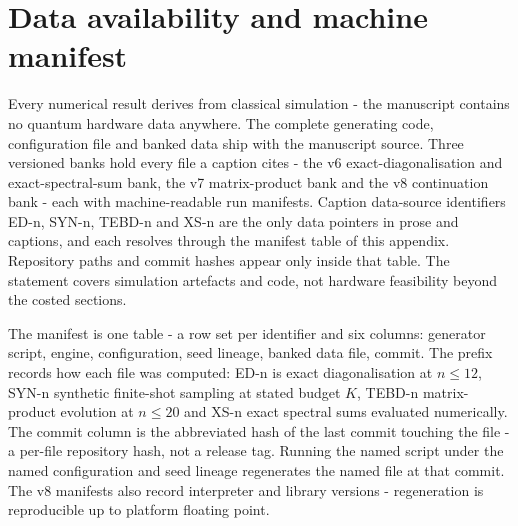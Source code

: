 \section{Data availability and machine manifest}\label{app:NA2}

Every numerical result derives from classical simulation - the manuscript contains no quantum hardware data anywhere. The complete generating code, configuration file and banked data ship with the manuscript source. Three versioned banks hold every file a caption cites - the v6 exact-diagonalisation and exact-spectral-sum bank, the v7 matrix-product bank and the v8 continuation bank - each with machine-readable run manifests. Caption data-source identifiers ED-n, SYN-n, TEBD-n and XS-n are the only data pointers in prose and captions, and each resolves through the manifest table of this appendix. Repository paths and commit hashes appear only inside that table. The statement covers simulation artefacts and code, not hardware feasibility beyond the costed sections.

The manifest is one table - a row set per identifier and six columns: generator script, engine, configuration, seed lineage, banked data file, commit. The prefix records how each file was computed: ED-n is exact diagonalisation at $n \le 12$, SYN-n synthetic finite-shot sampling at stated budget $K$, TEBD-n matrix-product evolution at $n \le 20$ and XS-n exact spectral sums evaluated numerically. The commit column is the abbreviated hash of the last commit touching the file - a per-file repository hash, not a release tag. Running the named script under the named configuration and seed lineage regenerates the named file at that commit. The v8 manifests also record interpreter and library versions - regeneration is reproducible up to platform floating point.

